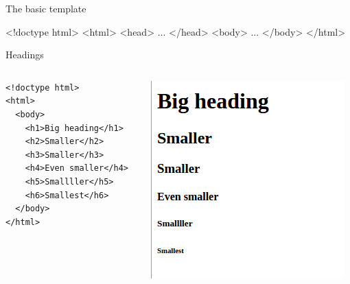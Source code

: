 \documentclass{beamer}
\begin{document}
\begin{frame}[fragile]{The basic template}
 \begin{block}{}
  \begin{semiverbatim}
   <!doctype html>
   <html>
     <head>
       ...
     </head>
     <body>
       ...
     </body>
   </html>
  \end{semiverbatim}
 \end{block}
\end{frame}

\begin{frame}[fragile]{Headings}
  \begin{columns}
    \begin{column}{0.45\columnwidth}
      \begin{block}{}
        \begin{verbatim}
<!doctype html>
<html>
  <body>
    <h1>Big heading</h1>
    <h2>Smaller</h2>
    <h3>Smaller</h3>
    <h4>Even smaller</h4>
    <h5>Smallller</h5>
    <h6>Smallest</h6>
  </body>
</html>
        \end{verbatim}
      \end{block}
    \end{column}
    \begin{column}{0.45\columnwidth}
      \begin{block}{}
        \includegraphics[width=.9\linewidth]{headings.png}
      \end{block}
    \end{column}
  \end{columns}
\end{frame}
\end{document}
